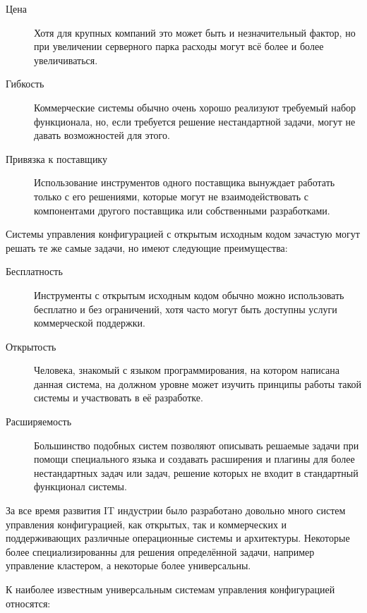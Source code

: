 \begin{description}
\item[Цена] Хотя для крупных компаний это может быть и незначительный фактор, но при увеличении серверного парка расходы могут всё более и более увеличиваться.
\item[Гибкость] Коммерческие системы обычно очень хорошо реализуют требуемый набор функционала, но, если требуется решение нестандартной задачи, могут не давать возможностей для этого.
\item[Привязка к поставщику] Использование инструментов одного поставщика вынуждает работать только с его решениями, которые могут не взаимодействовать с компонентами другого поставщика или собственными разработками.
\end{description}

Системы управления конфигурацией с открытым исходным кодом зачастую могут решать те же самые задачи, но имеют следующие преимущества:

\begin{description}
\item[Бесплатность] Инструменты с открытым исходным кодом обычно можно использовать бесплатно и без ограничений, хотя часто могут быть доступны услуги коммерческой поддержки.
\item[Открытость] Человека, знакомый с языком программирования, на котором написана данная система, на должном уровне может изучить принципы работы такой системы и участвовать в её разработке.
\item[Расширяемость] Большинство подобных систем позволяют описывать решаемые задачи при помощи специального языка и создавать расширения и плагины для более нестандартных задач или задач, решение которых не входит в стандартный функционал системы.
\end{description}

За все время развития IT индустрии было разработано довольно много систем управления конфигурацией, как открытых, так и коммерческих и поддерживающих различные операционные системы и архитектуры. Некоторые более специализированны для решения определённой задачи, например управление кластером, а некоторые более универсальны.

К наиболее известным универсальным системам управления конфигурацией относятся:

